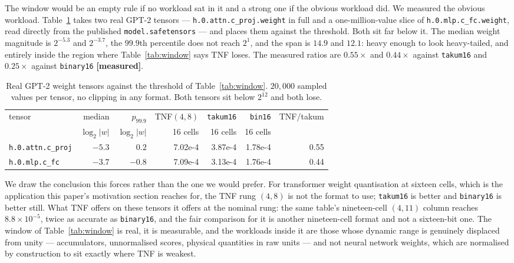 \documentclass[11pt]{article}
\theoremstyle{definition}
\begin{document}
The window would be an empty rule if no workload sat in it and a strong one if the
obvious workload did. We measured the obvious workload. Table~\ref{tab:gpt2window}
takes two real GPT-2 tensors --- \texttt{h.0.attn.c\_proj.weight} in full and a
one-million-value slice of \texttt{h.0.mlp.c\_fc.weight}, read directly from the
published \texttt{model.safetensors} --- and places them against the threshold.
Both sit far below it. The median weight magnitude is $2^{-5.3}$ and $2^{-3.7}$, the
$99.9$th percentile does not reach $2^{1}$, and the span is $14.9$ and $12.1$: heavy
enough to look heavy-tailed, and entirely inside the region where
Table~\ref{tab:window} says TNF loses. The measured ratios are $0.55\times$ and
$0.44\times$ against \texttt{takum16} and $0.25\times$ against \texttt{binary16}
\textbf{[measured]}.

\begin{table}[htbp]\centering\small
\caption{Real GPT-2 weight tensors against the threshold of
Table~\ref{tab:window}. $20{,}000$ sampled values per tensor, no clipping in any
format. Both tensors sit below $2^{12}$ and both lose.}
\label{tab:gpt2window}
\begin{tabular}{lrrrrrr}
\hline
tensor & median & $p_{99.9}$ & TNF$(4,8)$ & \texttt{takum16} & \texttt{bin16} & TNF/takum \\
 & $\log_2|w|$ & $\log_2|w|$ & 16 cells & 16 cells & 16 cells & \\
\hline
\texttt{h.0.attn.c\_proj} & $-5.3$ & $0.2$ & 7.02e-4 & 3.87e-4 & 1.78e-4 & 0.55 \\
\texttt{h.0.mlp.c\_fc} & $-3.7$ & $-0.8$ & 7.09e-4 & 3.13e-4 & 1.76e-4 & 0.44 \\
\hline
\end{tabular}
\end{table}

We draw the conclusion this forces rather than the one we would prefer. For
transformer weight quantisation at sixteen cells, which is the application this
paper's motivation section reaches for, the TNF rung $(4,8)$ is not the format to
use; \texttt{takum16} is better and \texttt{binary16} is better still. What TNF
offers on these tensors it offers at the nominal rung: the same table's nineteen-cell
$(4,11)$ column reaches $8.8\times 10^{-5}$, twice as accurate as
\texttt{binary16}, and the fair comparison for it is another nineteen-cell format
and not a sixteen-bit one. The window of Table~\ref{tab:window} is real, it is
measurable, and the workloads inside it are those whose dynamic range is genuinely
displaced from unity --- accumulators, unnormalised scores, physical quantities in
raw units --- and not neural network weights, which are normalised by construction
to sit exactly where TNF is weakest.
\end{document}
